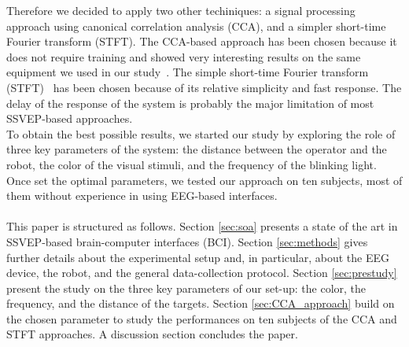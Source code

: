\documentclass[smallextended]{svjour3}
\begin{document}
Therefore we decided to apply two other techiniques: a signal processing approach using canonical correlation analysis (CCA), and a simpler short-time Fourier transform (STFT).
The CCA-based approach has been chosen because it does not require training and showed very interesting results on the same equipment we used in our study~\cite{Lin2014}.
The simple short-time Fourier transform (STFT)~\cite{Durak2003} has been chosen because of its relative simplicity and fast response. The delay of the response of the system is probably the major limitation of most SSVEP-based approaches.\\
To obtain the best possible results, we started our study by exploring the role of three key parameters of the system: the distance between the operator and the robot, the color of the visual stimuli, and the frequency of the blinking light. 
Once set the optimal parameters, we tested our approach on ten subjects, most of them without experience in using EEG-based interfaces. \\
\\
This paper is structured as follows. Section \ref{sec:soa} presents a state of the art in SSVEP-based brain-computer interfaces (BCI). Section \ref{sec:methods} gives further details about the experimental setup and, in particular, about the EEG device, the robot, and the general data-collection protocol. 
Section \ref{sec:prestudy} present the study on the three key parameters of our set-up: the color, the frequency, and the distance of the targets. Section \ref{sec:CCA_approach} build on the chosen parameter to study the performances on ten subjects of the CCA and STFT approaches. A discussion section concludes the paper.
\end{document}
